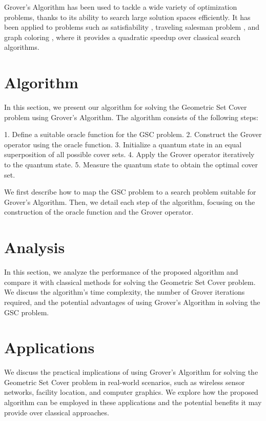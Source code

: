 Grover's Algorithm has been used to tackle a wide variety of optimization problems, thanks to its ability to search large solution spaces efficiently. It has been applied to problems such as satisfiability \cite{shenvi2003}, traveling salesman problem \cite{zalka1999}, and graph coloring \cite{childs2010}, where it provides a quadratic speedup over classical search algorithms.

\section{Algorithm}
\label{sec:algorithm}

In this section, we present our algorithm for solving the Geometric Set Cover problem using Grover's Algorithm. The algorithm consists of the following steps:

1. Define a suitable oracle function for the GSC problem.
2. Construct the Grover operator using the oracle function.
3. Initialize a quantum state in an equal superposition of all possible cover sets.
4. Apply the Grover operator iteratively to the quantum state.
5. Measure the quantum state to obtain the optimal cover set.

We first describe how to map the GSC problem to a search problem suitable for Grover's Algorithm. Then, we detail each step of the algorithm, focusing on the construction of the oracle function and the Grover operator.

\section{Analysis}
\label{sec:analysis}

In this section, we analyze the performance of the proposed algorithm and compare it with classical methods for solving the Geometric Set Cover problem. We discuss the algorithm's time complexity, the number of Grover iterations required, and the potential advantages of using Grover's Algorithm in solving the GSC problem.

\section{Applications}
\label{sec:applications}

We discuss the practical implications of using Grover's Algorithm for solving the Geometric Set Cover problem in real-world scenarios, such as wireless sensor networks, facility location, and computer graphics. We explore how the proposed algorithm can be employed in these applications and the potential benefits it may provide over classical approaches.

